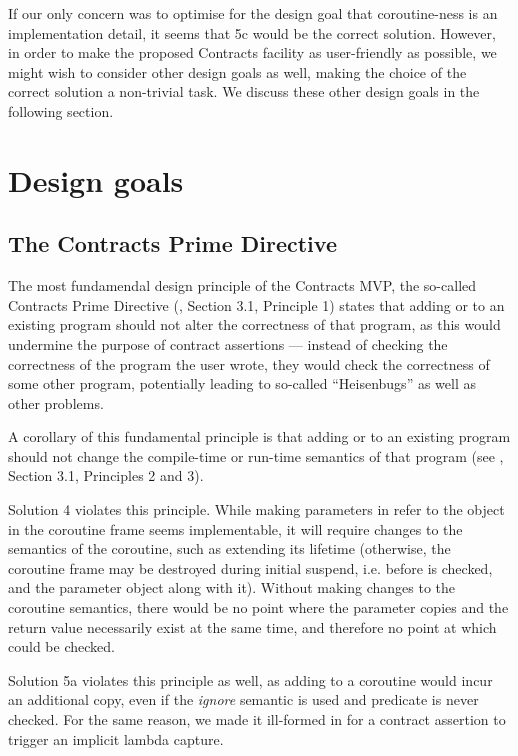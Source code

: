 If our only concern was to optimise for the design goal that coroutine-ness is an implementation detail, it seems that 5c would be the correct solution. However, in order to make the proposed Contracts facility as user-friendly as possible, we might wish to consider other design goals as well, making the choice of the correct solution a non-trivial task. We discuss these other design goals in the following section.

\section{Design goals}

\subsection{The Contracts Prime Directive}

The most fundamendal design principle of the Contracts MVP, the so-called Contracts Prime Directive (\cite{P2900R8}, Section 3.1, Principle 1) states that adding  or  to an existing program should not alter the correctness of that program, as this would undermine the purpose of contract assertions --- instead of checking the correctness of the program the user wrote, they would check the correctness of some other program, potentially leading to so-called ``Heisenbugs'' as well as other problems.

A corollary of this fundamental principle is that adding  or  to an existing program should not change the compile-time or run-time semantics of that program (see \cite{P2900R8}, Section 3.1, Principles 2 and 3).

Solution 4 violates this principle. While making parameters in  refer to the object in the coroutine frame seems implementable, it will require changes to the semantics of the coroutine, such as extending its lifetime (otherwise, the coroutine frame may be destroyed during initial suspend, i.e. before  is checked, and the parameter object along with it). Without making changes to the coroutine semantics, there would be no point where the parameter copies and the return value necessarily exist at the same time, and therefore no point at which  could be checked.

Solution 5a violates this principle as well, as adding  to a coroutine would incur an additional copy, even if the \emph{ignore} semantic is used and predicate is never checked. For the same reason, we made it ill-formed in \cite{P2900R8} for a contract assertion to trigger an implicit lambda capture.


